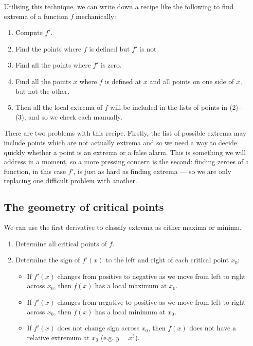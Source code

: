 Utilising this technique, we can write down a recipe like the following to find extrema of a function $ f $ mechanically:
\begin{enumerate}
  \item Compute $ f' $.
  \item Find the points where $ f $ is defined but $ f' $ is not
  \item Find all the points where $ f' $ is zero.
  \item Find all the points $ x $ where $ f $ is defined at $ x $ and all points on one side of $ x $, but not the other.
  \item Then all the local extrema of $ f $ will be included in the lists of points in (2)--(3), and so we check each
        manually.
\end{enumerate}

There are two problems with this recipe. Firstly, the list of possible extrema may include points which are not actually
extrema and so we need a way to decide quickly whether a point is an extrema or a false alarm. This is something we will
address in a moment, so a more pressing concern is the second: finding zeroes of a function, in this case $ f' $, is just
as hard as finding extrema --- so we are only replacing one difficult problem with another.

\subsection{The geometry of critical points}
We can use the first derivative to classify extrema as either maxima or minima.
\begin{enumerate}
  \item Determine all critical points of $ f $.
  \item Determine the sign of $ f'(x) $ to the left and right of each critical point $ x_0 $:
    \begin{itemize}
      \item If $ f'(x) $ changes from positive to negative as we move from left to right across $ x_0 $, then $ f(x) $ has a local maximum at $ x_0 $.
      \item If $ f'(x) $ changes from negative to positive as we move from left to right across $ x_0 $, then $ f(x) $ has a local minimum at $ x_0 $.
      \item If $ f'(x) $ does not change sign across $ x_0 $, then $ f(x) $ does not have a relative extremum at $ x_0 $ (e.g. $ y = x^3 $).
    \end{itemize}
\end{enumerate}

